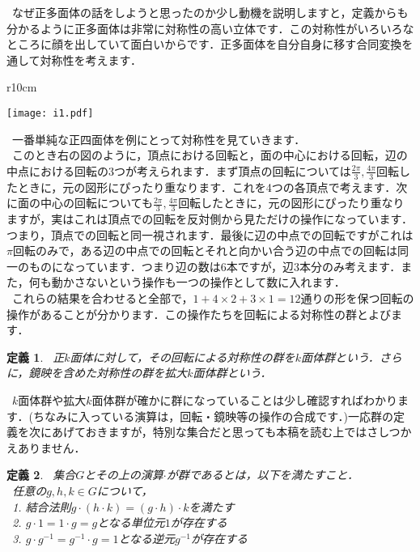 \documentclass{jreport}
\theoremstyle{idefinition}
\newtheorem{idefi}{定義}[section]
\begin{document}
\ なぜ正多面体の話をしようと思ったのか少し動機を説明しますと，定義からも分かるように正多面体は非常に対称性の高い立体です．この対称性がいろいろなところに顔を出していて面白いからです．正多面体を自分自身に移す合同変換を通して対称性を考えます．\\

\newpage

\begin{wrapfigure}{r}{10cm}
\vspace{-4\baselineskip}
\begin{center}
\texttt{[image: i1.pdf]}
\end{center}
\vspace{-3\baselineskip}
\end{wrapfigure}


\ 一番単純な正四面体を例にとって対称性を見ていきます．\\
\ このとき右の図のように，頂点における回転と，面の中心における回転，辺の中点における回転の$3$つが考えられます．まず頂点の回転については$\frac{2\pi}{3},\frac{4\pi}{3}$回転したときに，元の図形にぴったり重なります．これを4つの各頂点で考えます．次に面の中心の回転についても$\frac{2\pi}{3},\frac{4\pi}{3}$回転したときに，元の図形にぴったり重なりますが，実はこれは頂点での回転を反対側から見ただけの操作になっています．つまり，頂点での回転と同一視されます．最後に辺の中点での回転ですがこれは$\pi$回転のみで，ある辺の中点での回転とそれと向かい合う辺の中点での回転は同一のものになっています．つまり辺の数は6本ですが，辺3本分のみ考えます．また，何も動かさないという操作も一つの操作として数に入れます．\\
\ これらの結果を合わせると全部で，$1+4\times2 +3 \times 1 =12$通りの形を保つ回転の操作があることが分かります．この操作たちを回転による対称性の群とよびます．\\


\begin{idefi}
\ 正$k$面体に対して，その回転による対称性の群を$k$面体群という．さらに，鏡映を含めた対称性の群を拡大$k$面体群という．
\end{idefi}

\ $k$面体群や拡大$k$面体群が確かに群になっていることは少し確認すればわかります．(ちなみに入っている演算は，回転・鏡映等の操作の合成です．)一応群の定義を次にあげておきますが，特別な集合だと思っても本稿を読む上ではさしつかえありません．\\

\begin{idefi}
\ 集合$G$とその上の演算$\cdot$が群であるとは，以下を満たすこと．\\
\ 任意の$g,h,k \in G$について，\\
\ 1. 結合法則$g\cdot(h\cdot k)=(g\cdot h)\cdot k$を満たす\\
\ 2. $g\cdot 1=1 \cdot g=g$となる単位元$1$が存在する\\
\ 3. $g\cdot g^{-1}=g^{-1}\cdot g=1$となる逆元$g^{-1}$が存在する\\
\end{idefi}
\end{document}
